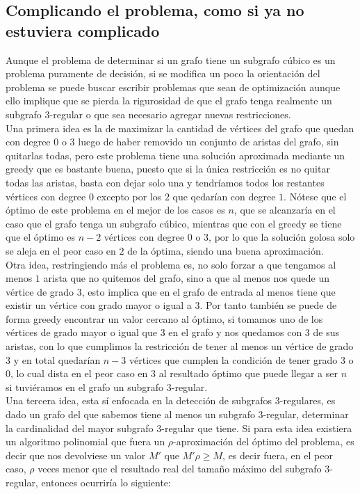 \documentclass{article}
\begin{document}
	

\subsection*{Complicando el problema, como si ya no estuviera complicado}
Aunque el problema de determinar si un grafo tiene un subgrafo c\'ubico es un problema puramente de decisi\'on, 
si se modifica un poco la orientaci\'on del problema se puede buscar escribir problemas que sean de optimizaci\'on 
aunque ello implique que se pierda la rigurosidad de que el grafo tenga realmente un subgrafo $3$-regular o que 
sea necesario agregar nuevas restricciones.\\


Una primera idea es la de maximizar la cantidad de v\'ertices del grafo que quedan con degree $0$ o $3$ luego de haber 
removido un conjunto de aristas del grafo, sin quitarlas todas, pero este problema tiene una soluci\'on aproximada mediante un greedy 
que es bastante buena, puesto que si la \'unica restricci\'on es no quitar todas las aristas, basta con dejar solo una 
y tendr\'iamos todos los restantes v\'ertices con degree $0$ excepto por los $2$ que qedar\'ian con degree $1$. N\'otese que el 
\'optimo de este problema en el mejor de los casos es $n$, que se alcanzar\'ia en el caso que el grafo tenga un subgrafo c\'ubico, mientras 
que con el greedy se tiene que el \'optimo es $n-2$ v\'ertices con degree $0$ o  $3$, por lo que la soluci\'on golosa solo se aleja en el peor caso 
en $2$ de la \'optima, siendo una buena aproximaci\'on.\\ 

Otra idea, restringiendo m\'as el problema es, no solo forzar a que tengamos al menos $1$ arista que no quitemos del grafo, sino 
a que al menos nos quede un v\'ertice de grado $3$, esto implica que en el grafo de entrada al menos tiene que existir un v\'ertice con grado 
mayor o igual a $3$. Por tanto tambi\'en se puede de forma greedy encontrar un valor cercano al \'optimo, si tomamos uno de los v\'ertices de grado mayor  
o igual que $3$ en el grafo y nos quedamos con $3$ de sus aristas, con lo que cumplimos la restricci\'on de tener al menos un v\'ertice de grado $3$ y en total 
quedar\'ian $n-3$ v\'ertices que cumplen la condici\'on de tener grado $3$ o $0$, lo cual dista en el peor caso en $3$ al resultado \'optimo que puede llegar a ser $n$
si tuvi\'eramos en el grafo un subgrafo $3$-regular.\\ 

Una tercera idea, esta s\'i enfocada en la detecci\'on de subgrafos $3$-regulares, es dado un grafo del que sabemos tiene al menos un subgrafo $3$-regular, determinar la cardinalidad del 
mayor subgrafo $3$-regular que tiene. Si para esta idea existiera un algoritmo polinomial que fuera un $\rho$-aproximaci\'on del \'optimo del problema, es decir que nos devolviese un valor $M'$
que $M'\rho \geq M$, es decir fuera, en el peor caso, $\rho$ veces menor que el resultado real del tama\~no m\'aximo del subgrafo $3$-regular, entonces ocurrir\'ia lo siguiente: \\ 
\end{document}
